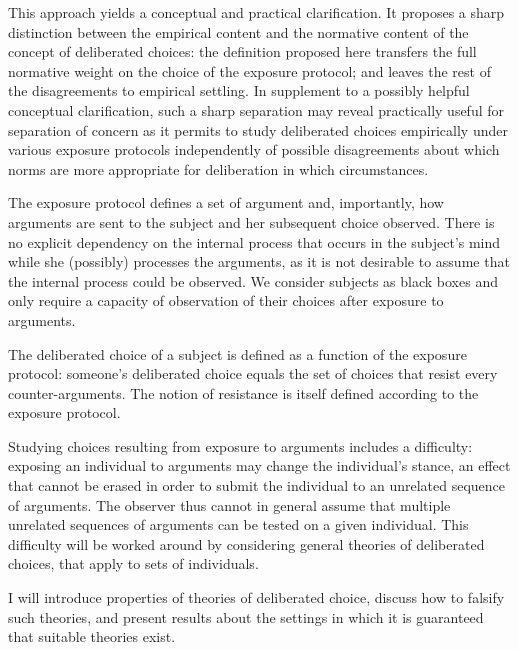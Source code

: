 \documentclass[version=last, pagesize, twoside=off, bibliography=totoc, DIV=calc, fontsize=12pt, a4paper, french, english]{scrartcl}
\begin{document}
This approach yields a conceptual and practical clarification. It proposes a sharp distinction between the empirical content and the normative content of the concept of deliberated choices: the definition proposed here transfers the full normative weight on the choice of the exposure protocol; and leaves the rest of the disagreements to empirical settling. 
In supplement to a possibly helpful conceptual clarification, such a sharp separation may reveal practically useful for separation of concern as it permits to study deliberated choices empirically under various exposure protocols independently of possible disagreements about which norms are more appropriate for deliberation in which circumstances.

The exposure protocol defines a set of argument and, importantly, how arguments are sent to the subject and her subsequent choice observed. There is no explicit dependency on the internal process that occurs in the subject’s mind while she (possibly) processes the arguments, as it is not desirable to assume that the internal process could be observed. We consider subjects as black boxes and only require a capacity of observation of their choices after exposure to arguments.

The deliberated choice of a subject is defined as a function of the exposure protocol: someone’s deliberated choice equals the set of choices that resist every counter-arguments. The notion of resistance is itself defined according to the exposure protocol.

Studying choices resulting from exposure to arguments includes a difficulty: exposing an individual to arguments may change the individual’s stance, an effect that cannot be erased in order to submit the individual to an unrelated sequence of arguments. The observer thus cannot in general assume that multiple unrelated sequences of arguments can be tested on a given individual. This difficulty will be worked around by considering general theories of deliberated choices, that apply to sets of individuals. 

I will introduce properties of theories of deliberated choice, discuss how to falsify such theories, and present results about the settings in which it is guaranteed that suitable theories exist.


\end{document}
